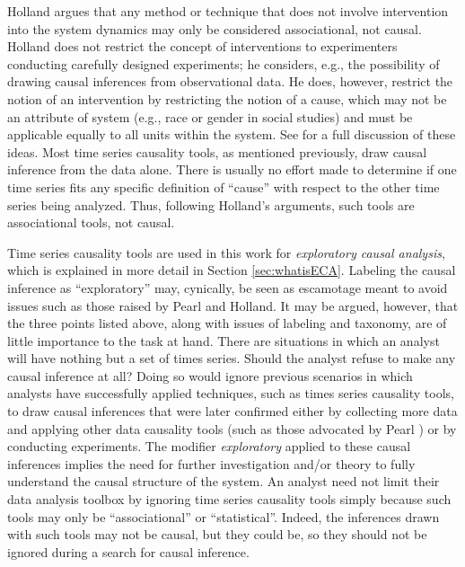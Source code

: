 Holland \cite{Holland1986} argues that any method or technique that does not involve intervention into the system dynamics may only be considered associational, not causal.  Holland does not restrict the concept of interventions to experimenters conducting carefully designed experiments; he considers, e.g., the possibility of drawing causal inferences from observational data.  He does, however, restrict the notion of an intervention by restricting the notion of a cause, which may not be an attribute of system (e.g., race or gender in social studies) and must be applicable equally to all units within the system.  See \cite{Holland1986} for a full discussion of these ideas.  Most time series causality tools, as mentioned previously, draw causal inference from the data alone.  There is usually no effort made to determine if one time series fits any specific definition of ``cause'' with respect to the other time series being analyzed.  Thus, following Holland's arguments, such tools are associational tools, not causal.

Time series causality tools are used in this work for {\em exploratory causal analysis}, which is explained in more detail in Section \ref{sec:whatisECA}.  Labeling the causal inference as ``exploratory'' may, cynically, be seen as escamotage meant to avoid issues such as those raised by Pearl and Holland.  It may be argued, however, that the three points listed above, along with issues of labeling and taxonomy, are of little importance to the task at hand.  There are situations in which an analyst will have nothing but a set of times series.  Should the analyst refuse to make any causal inference at all?  Doing so would ignore previous scenarios in which analysts have successfully applied techniques, such as times series causality tools, to draw causal inferences that were later confirmed either by collecting more data and applying other data causality tools (such as those advocated by Pearl \cite{Pearl2000}) or by conducting experiments.  The modifier {\em exploratory} applied to these causal inferences implies the need for further investigation and/or theory to fully understand the causal structure of the system.  An analyst need not limit their data analysis toolbox by ignoring time series causality tools simply because such tools may only be ``associational'' or ``statistical''.  Indeed, the inferences drawn with such tools may not be causal, but they could be, so they should not be ignored during a search for causal inference.    


